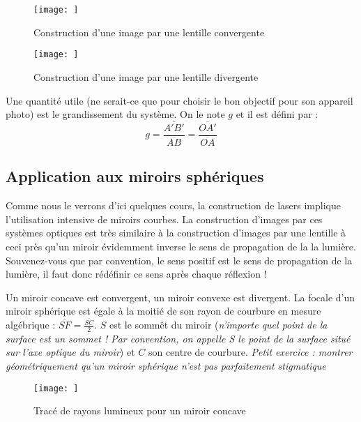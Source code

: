 \documentclass[a4paper]{article}
\begin{document}
\begin{figure}[!htbp]
\label{fig:image_lentille_convergente}
\begin{center}
\texttt{[image: ]}
\end{center}
\caption{Construction d'une image par une lentille convergente}
\end{figure}

\begin{figure}[!htbp]
\label{fig:image_lentille_divergente}
\begin{center}
\texttt{[image: ]}
\end{center}
\caption{Construction d'une image par une lentille divergente}
\end{figure}

Une quantité utile (ne serait-ce que pour choisir le bon objectif pour son appareil photo) est le grandissement du système. On le note $g$ et il est défini par :
\begin{equation}
\label{eq:grandissement}
g=\frac{\overline{A'B'}}{\overline{AB}}=\frac{\overline{OA'}}{\overline{OA}}
\end{equation}

\subsection{Application aux miroirs sphériques}

Comme nous le verrons d'ici quelques cours, la construction de lasers implique l'utilisation intensive de miroirs courbes. La construction d'images par ces systèmes optiques est très similaire à la construction d'images par une lentille à ceci près qu'un miroir évidemment inverse le sens de propagation de la la lumière. Souvenez-vous que par convention, le sens positif est le sens de propagation de la lumière, il faut donc rédéfinir ce sens après chaque réflexion ! 

Un miroir concave est convergent, un miroir convexe est divergent. La focale d'un miroir sphérique est égale à la moitié de son rayon de courbure en mesure algébrique : $\overline{SF}=\frac{\overline{SC}}{2}$. $S$ est le sommêt du miroir (\textit{n'importe quel point de la surface est un sommet ! Par convention, on appelle S le point de la surface situé sur l'axe optique du miroir}) et $C$ son centre de courbure.
\textit{Petit exercice : montrer géométriquement qu'un miroir sphérique n'est pas parfaitement stigmatique}
\begin{figure}[!htbp]
\label{fig:miroir_concave}
\begin{center}
\texttt{[image: ]}
\end{center}
\caption{Tracé de rayons lumineux pour un miroir concave}
\end{figure}
\end{document}
